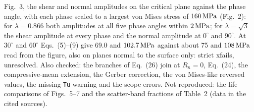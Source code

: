  Fig.~3, the shear and normal amplitudes on the critical plane against the phase
angle, with each phase scaled to a largest von Mises stress of $160\,\mathrm{MPa}$ (Fig.~2): for $\lambda=0.866$
both amplitudes at all five phase angles within $2\,\mathrm{MPa}$; for $\lambda=\sqrt3$ the shear amplitude at
every phase and the normal amplitude at $0^\circ$ and $90^\circ$. At $30^\circ$ and $60^\circ$
Eqs.~(5)--(9) give 69.0 and $102.7\,\mathrm{MPa}$ against about 75 and $108\,\mathrm{MPa}$ read from the figure, also on
planes normal to the surface only: strict xfails, unresolved. Also checked: the branches of Eq.~(26)
join at $R_n=0$, Eq.~(24), the compressive-mean extension, the Gerber correction, the von Mises-like
reversed values, the missing-\texttt{Tu} warning and the scope errors. Not reproduced: the life
comparisons of Figs.~5--7 and the scatter-band fractions of Table~2 (data in the cited sources).
